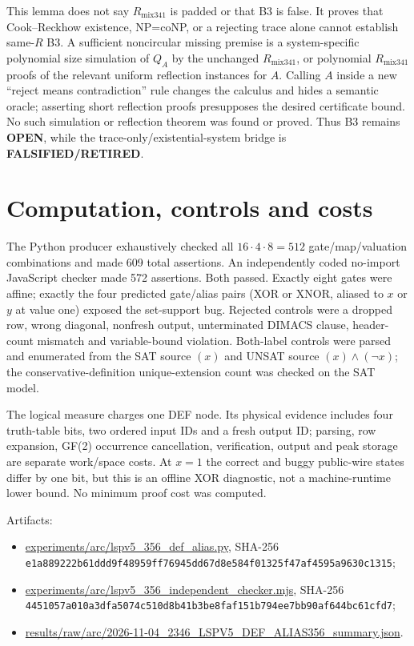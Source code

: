 \documentclass[11pt]{article}
\begin{document}
This lemma does not say $R_{\mathrm{mix341}}$ is padded or that B3 is false.  It proves that Cook--Reckhow existence, NP=coNP, or a rejecting trace alone cannot establish same-$R$ B3.  A sufficient noncircular missing premise is a system-specific polynomial size simulation of $Q_A$ by the unchanged $R_{\mathrm{mix341}}$, or polynomial $R_{\mathrm{mix341}}$ proofs of the relevant uniform reflection instances for $A$.  Calling $A$ inside a new ``reject means contradiction'' rule changes the calculus and hides a semantic oracle; asserting short reflection proofs presupposes the desired certificate bound.  No such simulation or reflection theorem was found or proved.  Thus B3 remains \textbf{OPEN}, while the trace-only/existential-system bridge is \textbf{FALSIFIED/RETIRED}.

\section{Computation, controls and costs}

The Python producer exhaustively checked all $16\cdot4\cdot8=512$ gate/map/valuation combinations and made 609 total assertions.  An independently coded no-import JavaScript checker made 572 assertions.  Both passed.  Exactly eight gates were affine; exactly the four predicted gate/alias pairs (XOR or XNOR, aliased to $x$ or $y$ at value one) exposed the set-support bug.  Rejected controls were a dropped row, wrong diagonal, nonfresh output, unterminated DIMACS clause, header-count mismatch and variable-bound violation.  Both-label controls were parsed and enumerated from the SAT source $(x)$ and UNSAT source $(x)\wedge(\neg x)$; the conservative-definition unique-extension count was checked on the SAT model.

The logical measure charges one DEF node.  Its physical evidence includes four truth-table bits, two ordered input IDs and a fresh output ID; parsing, row expansion, GF(2) occurrence cancellation, verification, output and peak storage are separate work/space costs.  At $x=1$ the correct and buggy public-wire states differ by one bit, but this is an offline XOR diagnostic, not a machine-runtime lower bound.  No minimum proof cost was computed.

Artifacts:
\begin{itemize}
\item \url{experiments/arc/lspv5_356_def_alias.py}, SHA-256 \texttt{e1a889222b61ddd9f48959ff76945dd67d8e584f01325f47af4595a9630c1315};
\item \url{experiments/arc/lspv5_356_independent_checker.mjs}, SHA-256 \texttt{4451057a010a3dfa5074c510d8b41b3be8faf151b794ee7bb90af644bc61cfd7};
\item \url{results/raw/arc/2026-11-04_2346_LSPV5_DEF_ALIAS356_summary.json}.
\end{itemize}
\end{document}

